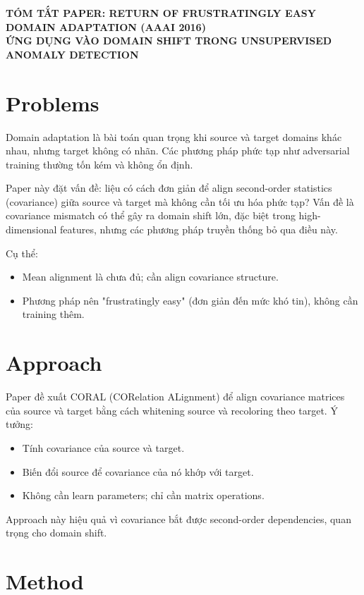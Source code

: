 \documentclass[a4paper]{article}
\begin{document}
\begin{center}
    \textbf{\Large TÓM TẮT PAPER: RETURN OF FRUSTRATINGLY EASY DOMAIN ADAPTATION (AAAI 2016)}\\[0.2cm]
    \textbf{\Large ỨNG DỤNG VÀO DOMAIN SHIFT TRONG UNSUPERVISED ANOMALY DETECTION}
\end{center}

\section{Problems}

Domain adaptation là bài toán quan trọng khi source và target domains khác nhau, nhưng target không có nhãn. Các phương pháp phức tạp như adversarial training thường tốn kém và không ổn định.

Paper này đặt vấn đề: liệu có cách đơn giản để align second-order statistics (covariance) giữa source và target mà không cần tối ưu hóa phức tạp? Vấn đề là covariance mismatch có thể gây ra domain shift lớn, đặc biệt trong high-dimensional features, nhưng các phương pháp truyền thống bỏ qua điều này.

Cụ thể:
\begin{itemize}
    \item Mean alignment là chưa đủ; cần align covariance structure.
    \item Phương pháp nên "frustratingly easy" (đơn giản đến mức khó tin), không cần training thêm.
\end{itemize}

\section{Approach}

Paper đề xuất CORAL (CORelation ALignment) để align covariance matrices của source và target bằng cách whitening source và recoloring theo target. Ý tưởng:
\begin{itemize}
    \item Tính covariance của source và target.
    \item Biến đổi source để covariance của nó khớp với target.
    \item Không cần learn parameters; chỉ cần matrix operations.
\end{itemize}

Approach này hiệu quả vì covariance bắt được second-order dependencies, quan trọng cho domain shift.

\section{Method}
\end{document}
